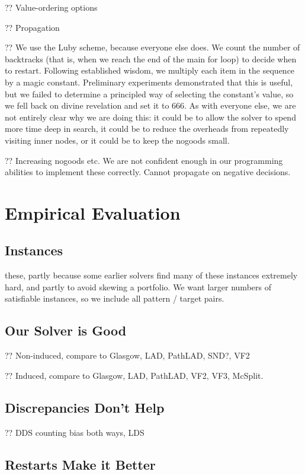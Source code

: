 \documentclass{article}
\begin{document}
?? Value-ordering options

?? Propagation

?? We use the Luby scheme, because everyone else does. We count the number of backtracks (that is,
when we reach the end of the main for loop) to decide when to restart. Following established wisdom,
we multiply each item in the sequence by a magic constant. Preliminary experiments demonstrated that
this is useful, but we failed to determine a principled way of selecting the constant's value, so we
fell back on divine revelation and set it to 666. As with everyone else, we are not entirely clear
why we are doing this: it could be to allow the solver to spend more time deep in search, it could
be to reduce the overheads from repeatedly visiting inner nodes, or it could be to keep the nogoods
small.

?? Increasing nogoods etc. We are not confident enough in our programming abilities to implement
these correctly. Cannot propagate on negative decisions.

\section{Empirical Evaluation}

\subsection{Instances}

these, partly because some earlier solvers find many of these instances extremely hard, and partly
to avoid skewing a portfolio. We want larger numbers of satisfiable instances, so we include all
pattern / target pairs.

\subsection{Our Solver is Good}

?? Non-induced, compare to Glasgow, LAD, PathLAD, SND?, VF2

?? Induced, compare to Glasgow, LAD, PathLAD, VF2, VF3, McSplit.

\subsection{Discrepancies Don't Help}

?? DDS counting bias both ways, LDS

\subsection{Restarts Make it Better}
\end{document}
